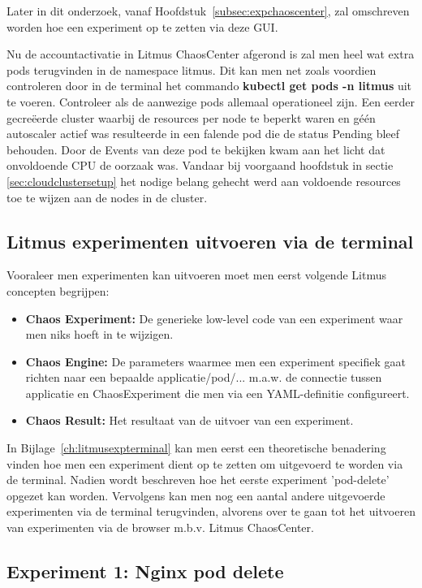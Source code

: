 Later in dit onderzoek, vanaf Hoofdstuk~\ref{subsec:expchaoscenter}, zal omschreven worden hoe een experiment op te zetten via deze GUI. 
 
Nu de accountactivatie in Litmus ChaosCenter afgerond is zal men heel wat extra pods terugvinden in de namespace litmus. Dit kan men net zoals voordien controleren door in de terminal het commando {\bf kubectl get pods -n litmus} uit te voeren. Controleer als de aanwezige pods allemaal operationeel zijn. \newline Een eerder gecreëerde cluster waarbij de resources per node te beperkt waren en géén autoscaler actief was resulteerde in een falende pod die de status Pending bleef behouden. Door de Events van deze pod te bekijken kwam aan het licht dat onvoldoende CPU de oorzaak was.  
Vandaar bij voorgaand hoofdstuk in sectie \ref {sec:cloudclustersetup} het nodige belang gehecht werd aan voldoende resources toe te wijzen aan de nodes in de cluster. 

\subsection{Litmus experimenten uitvoeren via de terminal}

Vooraleer men experimenten kan uitvoeren moet men eerst volgende Litmus concepten begrijpen:
\begin{itemize}
    \item {\bf Chaos Experiment:} De generieke low-level code van een experiment waar men niks hoeft in te wijzigen.
    \item {\bf Chaos Engine:} De parameters waarmee men een experiment specifiek gaat richten naar een bepaalde applicatie/pod/... m.a.w. de connectie tussen applicatie en ChaosExperiment die men via een YAML-definitie configureert.
    \item {\bf Chaos Result:} Het resultaat van de uitvoer van een experiment. 
\end{itemize} 
 
In Bijlage~\ref{ch:litmusexpterminal} kan men eerst een theoretische benadering vinden hoe men een experiment dient op te zetten om uitgevoerd te worden via de terminal. Nadien wordt beschreven hoe het eerste experiment 'pod-delete' opgezet kan worden. Vervolgens kan men nog een aantal andere uitgevoerde experimenten via de terminal terugvinden, alvorens over te gaan tot het uitvoeren van experimenten via de browser m.b.v. Litmus ChaosCenter.
 
\subsection{Experiment 1: Nginx pod delete}

